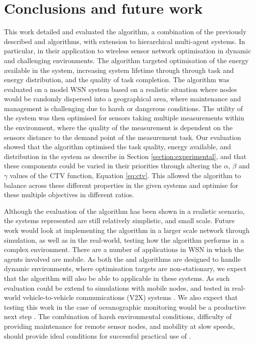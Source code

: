\section{Conclusions and future work}
\label{section:conclusions}

This work detailed and evaluated the \acronymWSNOptimisation{}{} algorithm, a combination of the previously described \acronymATARIA{}{} and \acronymMGRAO{}{} algorithms, with extension to hierarchical multi-agent systems. In particular, in their application to wireless sensor network optimisation in dynamic and challenging environments. The algorithm targeted optimisation of the energy available in the system, increasing system lifetime through through task and energy distribution, and the quality of task completion. The algorithm was evaluated on a model WSN system based on a realistic situation where nodes would be randomly dispersed into a geographical area, where maintenance and management is challenging due to harsh or dangerous conditions. The utility of the system was then optimised for sensors taking multiple measurements within the environment, where the quality of the measurement is dependent on the sensors distance to the demand point of the measurement task. Our evaluation showed that the \acronymWSNOptimisation{}{} algorithm optimised the task quality, energy available, and distribution in the system as describe in Section \ref{section:experimental}, and that these components could be varied in their priorities through altering the $\alpha$, $\beta$ and $\gamma$ values of the CTV function, Equation \ref{eq:ctv}. This allowed the algorithm to balance across these different properties in the given systems and optimise for these multiple objectives in different ratios. 

Although the evaluation of the algorithm has been shown in a realistic scenario, the systems represented are still relatively simplistic, and small scale. Future work would look at implementing the algorithm in a larger scale network through simulation, as well as in the real-world, testing how the algorithm performs in a complex environment. There are a number of applications in WSN in which the agents involved are mobile. As both the \acronymATARIA{}{} and \acronymMGRAO{}{} algorithms are designed to handle dynamic environments, where optimisation targets are non-stationary, we expect that the \acronymWSNOptimisation{}{} algorithm will also be able to applicable in these systems. As such evaluation could be extend to simulations with mobile nodes, and tested in real-world vehicle-to-vehicle communications (V2X) systems \citep{Gupta2017, Tong2019}. We also expect that testing this work in the case of oceanographic monitoring would be a productive next step \citep{Albaladejo2010a}. The combination of harsh environmental conditions, difficulty of providing maintenance for remote sensor nodes, and mobility at slow speeds, should provide ideal conditions for successful practical use of \acronymWSNOptimisation{}{}.


  